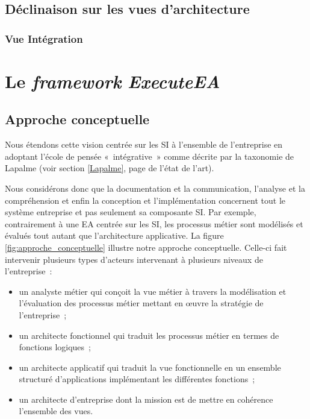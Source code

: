     \subsection{Déclinaison sur les vues d'architecture}

    \subsubsection{Vue Intégration}















\section[Le framework ExecuteEA]{Le \emph{framework} \emph{ExecuteEA}}

    \subsection{Approche conceptuelle}
    Nous étendons
cette vision centrée sur les SI à l'ensemble de l'entreprise en adoptant l'école
de pensée «~intégrative~» comme décrite par la taxonomie de Lapalme (voir
section \ref{Lapalme}, page \pageref{Lapalme} de l'état de l'art).

Nous considérons donc que la documentation et la communication, l'analyse et la
compréhension et enfin la conception et l'implémentation concernent tout le système entreprise et
pas seulement sa composante SI. Par exemple, contrairement à une EA centrée sur
les SI, les processus métier sont modélisés et évalués tout autant que
l'architecture applicative. La figure \ref{fig:approche_conceptuelle} illustre
notre approche conceptuelle. Celle-ci fait intervenir plusieurs types d'acteurs
intervenant à plusieurs niveaux de l'entreprise~: \begin{itemize} \item un
analyste métier qui conçoit la vue métier à travers la modélisation et
l'évaluation des processus métier mettant en œuvre la stratégie de
l'entreprise~; \item un architecte fonctionnel qui traduit les processus métier
en termes de fonctions logiques~; \item un architecte applicatif qui traduit la
vue fonctionnelle en un ensemble structuré d'applications implémentant les
différentes fonctions~; \item un architecte d'entreprise dont la mission est de
mettre en cohérence l'ensemble des vues. \end{itemize}

